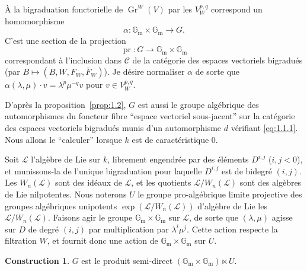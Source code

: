 \documentclass[12pt,a4paper]{article}
\theoremstyle{plain}
\theoremstyle{definition}
\newtheorem{construction}[lemme]{Construction}
\DeclareMathOperator{\Gr}{Gr}
\DeclareMathOperator{\pr}{pr}
\newcommand{\Gm}{\mathbb{G}_\mathrm{m}}
\begin{document}
\`{A} la bigraduation fonctorielle de $\Gr^W(V)$ par les $V_W^{p,q}$ correspond un
homomorphisme
\begin{equation*}
\alpha : \Gm \times \Gm \longrightarrow G.
\end{equation*}
C'est une section de la projection
\begin{equation*}
\pr : G \to \Gm \times \Gm
\end{equation*}
correspondant \`{a} l'inclusion dans $\mathscr{C}$ de la cat\'{e}gorie des espaces vectoriels
bigradu\'{e}s (par $B \mapsto (B, W, F_W, \bar{F}_W)$). Je d\'{e}sire normaliser $\alpha$ de sorte
que $\alpha(\lambda, \mu) \cdot v = \lambda^p \mu^{-q} v$ pour $v \in V_W^{p,q}$.

D'apr\`{e}s la proposition~\ref{prop:1.2}, $G$ est aussi le groupe alg\'{e}brique des automorphismes du foncteur fibre ``espace vectoriel sous-jacent'' sur la cat\'{e}gorie des
espaces vectoriels bigradu\'{e}s munis d'un automorphisme $d$ v\'{e}rifiant \eqref{eq:1.1.1}.
Nous allons le ``calculer'' lorsque $k$ est de caract\'{e}ristique $0$.

Soit $\mathcal{L}$ l'alg\`{e}bre de Lie sur $k$, librement engendr\'{e}e par des \'{e}l\'{e}ments
$D^{i,j}$ ($i, j < 0$), et munissons-la de l'unique bigraduation pour laquelle
$D^{i,j}$ est de bidegr\'{e} $(i, j)$. Les $W_n(\mathcal{L})$ sont des id\'{e}aux de $\mathcal{L}$, et les quotients $\mathcal{L}/W_n(\mathcal{L})$ sont des alg\`{e}bres de Lie nilpotentes. Nous noterons $U$ le
groupe pro-alg\'{e}brique limite projective des groupes alg\'{e}briques unipotents
$\exp(\mathcal{L}/W_n(\mathcal{L}))$ d'alg\`{e}bre de Lie les $\mathcal{L}/W_n(\mathcal{L})$. Faisons agir le groupe $\Gm \times \Gm$
sur $\mathcal{L}$, de sorte que $(\lambda, \mu)$ agisse sur $D$ de degr\'{e} $(i, j)$ par multiplication
par $\lambda^i \mu^j$. Cette action respecte la filtration $W$, et fournit donc une action
de $\Gm \times \Gm$ sur $U$.

\begin{construction}\label{constr:1.6}
$G$ est le produit semi-direct $(\Gm \times \Gm) \ltimes U$.
\end{construction}
\end{document}
